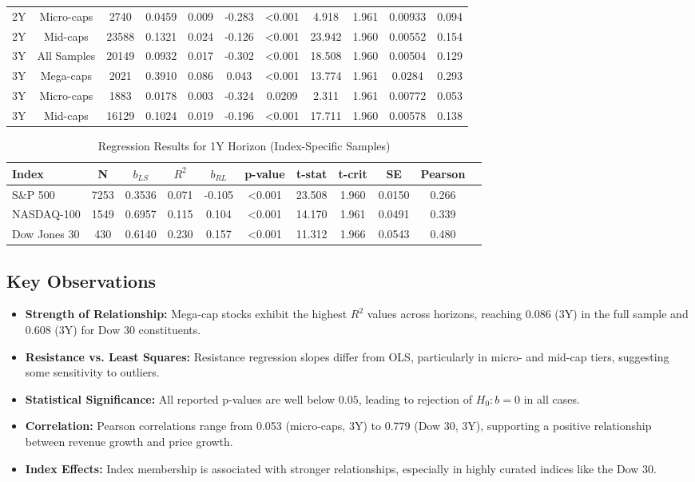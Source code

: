 \documentclass[11pt]{article}
\begin{document}
\begin{table*}[h]
\begin{tabular}{lcccccccccc}
2Y  & Micro-caps  & 2740  & 0.0459 & 0.009 & -0.283 & <0.001   &  4.918 & 1.961 & 0.00933 & 0.094 \\
2Y  & Mid-caps    & 23588 & 0.1321 & 0.024 & -0.126 & <0.001 & 23.942 & 1.960 & 0.00552 & 0.154 \\
\midrule
3Y  & All Samples & 20149 & 0.0932 & 0.017 & -0.302 & <0.001  & 18.508 & 1.960 & 0.00504 & 0.129 \\
3Y  & Mega-caps   & 2021  & 0.3910 & 0.086 &  0.043 & <0.001  & 13.774 & 1.961 & 0.0284  & 0.293 \\
3Y  & Micro-caps  & 1883  & 0.0178 & 0.003 & -0.324 & 0.0209                  &  2.311 & 1.961 & 0.00772 & 0.053 \\
3Y  & Mid-caps    & 16129 & 0.1024 & 0.019 & -0.196 & <0.001  & 17.711 & 1.960 & 0.00578 & 0.138 \\
\bottomrule
\end{tabular}
\end{table*}
\begin{table*}[h]
\centering
\caption{Regression Results for 1Y Horizon (Index-Specific Samples)}
\label{tab:regression-1y-index}
\small
\begin{tabular}{lcccccccccc}
\toprule
Index & N & $b_{LS}$ & $R^2$ & $b_{RL}$ & p-value & t-stat & t-crit & SE & Pearson \\
\midrule
S\&P 500     & 7253 & 0.3536 & 0.071 & -0.105 & <0.001 & 23.508 & 1.960 & 0.0150 & 0.266 \\
NASDAQ-100   & 1549 & 0.6957 & 0.115 &  0.104 & <0.001  & 14.170 & 1.961 & 0.0491 & 0.339 \\
Dow Jones 30 &  430 & 0.6140 & 0.230 &  0.157 & <0.001 & 11.312 & 1.966 & 0.0543 & 0.480 \\
\bottomrule
\end{tabular}
\end{table*}

\subsection{Key Observations}
\begin{itemize}
    \item \textbf{Strength of Relationship:} Mega-cap stocks exhibit the highest $R^2$ values across horizons, reaching $0.086$ (3Y) in the full sample and $0.608$ (3Y) for Dow 30 constituents.
    \item \textbf{Resistance vs. Least Squares:} Resistance regression slopes differ from OLS, particularly in micro- and mid-cap tiers, suggesting some sensitivity to outliers.
    \item \textbf{Statistical Significance:} All reported p-values are well below $0.05$, leading to rejection of $H_0: b = 0$ in all cases.
    \item \textbf{Correlation:} Pearson correlations range from 0.053 (micro-caps, 3Y) to 0.779 (Dow 30, 3Y), supporting a positive relationship between revenue growth and price growth.
    \item \textbf{Index Effects:} Index membership is associated with stronger relationships, especially in highly curated indices like the Dow 30.
\end{itemize}
\end{document}
